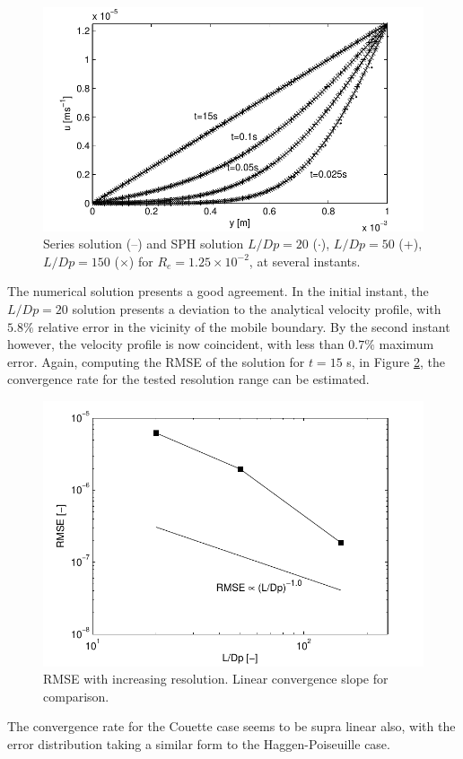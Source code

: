 %
\begin{figure}[ht!]
	\centering
	\includegraphics[width=0.70\linewidth]{Figures/5.Chapter/Couette}
	\caption{Series solution (--) and SPH solution $L/Dp=20$ ($\cdot$), $L/Dp=50$ (+), $L/Dp=150$ ($\times$) for $R_e=1.25\times10^{-2}$, at several instants.}
	\label{fig:Couette} 
\end{figure}
%
The numerical solution presents a good agreement. In the initial instant, the $L/Dp=20$ solution presents a deviation to the analytical velocity profile, with $5.8\%$ relative error in the vicinity of the mobile boundary. By the second instant however, the velocity profile is now coincident, with less than $0.7\%$ maximum error. Again, computing the \ac{RMSE} of the solution for $t=15$ s, in Figure \ref{fig:Ct_RMSE}, the convergence rate for the tested resolution range can be estimated.

%
\begin{figure}[ht!]
	\centering
	\includegraphics[width=0.70\linewidth]{Figures/5.Chapter/Ct_RMSE}
	\caption{\ac{RMSE} with increasing resolution. Linear convergence slope for comparison.}
	\label{fig:Ct_RMSE} 
\end{figure}
%
The convergence rate for the Couette case seems to be supra linear also, with the error distribution taking a similar form to the Haggen-Poiseuille case.



